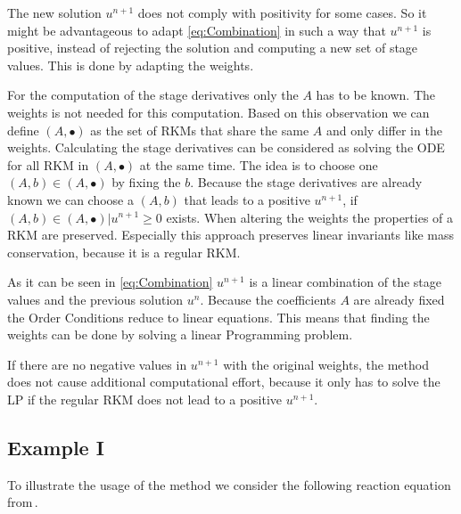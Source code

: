 \documentclass[a4paper]{scrartcl}
\numberwithin{equation}{section}
\theoremstyle{plain}
\theoremstyle{definition}
\numberwithin{theorem}{section}
\newcommand{\1}{\mathbbm{1}}
\begin{document}
The new solution $u^{n+1}$ does not comply with positivity for some cases. 
So it might be advantageous to adapt \eqref{eq:Combination} in such a way that $u^{n+1}$ is positive, instead of rejecting the solution and computing a new set of stage values. This is done by adapting the weights.




For the computation of the stage derivatives only the $A$ has to be known. The weights is not needed for this computation. 
Based on this observation we can define $(A,\bullet)$ as the set of RKMs that share the same $A$ and only differ in the weights.
Calculating the stage derivatives can be considered as solving the ODE for all RKM in $(A,\bullet)$ at the same time.
The idea is to choose one $(A,b) \in (A,\bullet)$ by fixing the $b$. 
Because the stage derivatives are already known we can choose a $(A,b)$ that leads to a positive $u^{n+1}$, if $(A,b) \in (A,\bullet) | u^{n+1} \geq 0$ exists.
When altering the weights the properties of a RKM are preserved. 
Especially this approach preserves linear invariants like mass conservation, because it is a regular RKM. 

As it can be seen in \eqref{eq:Combination} $u^{n+1}$ is a linear combination of the stage values and the previous solution $u^n$.
Because the coefficients $A$ are already fixed the Order Conditions reduce to linear equations.
This means that finding the weights can be done by solving a linear Programming problem.
 
If there are no negative values in $u^{n+1}$ with the original weights, the method does not cause additional computational effort, because it only has to solve the LP if the regular RKM does not lead to a positive $u^{n+1}$. %



\subsection{Example I}\label{sec:example_reac}

To illustrate the usage of the method we consider the following reaction equation from\,\cite{kopecz_comparison_2019}.
\end{document}
